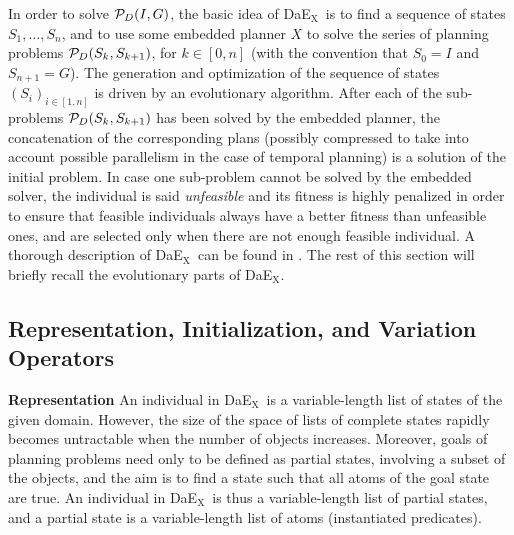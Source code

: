 \documentclass{llncs}
\def\DAEX{{\sc DaE$_{\text{X}}$}}
\renewcommand{\paragraph}[1]{{\bf #1}}
\begin{document}
In order to solve  ${\cal P}_D(I,G)$, the basic idea of \DAEX\ is to find a sequence of states $S_1, \ldots, S_n$, and to use some embedded planner $X$ to solve the series of planning problems ${\cal P}_D(S_{k},S_{k+1})$, for $k \in [0,n]$ (with the convention that $S_0 = I$ and $S_{n+1} = G$).
The generation and optimization of the sequence of states $(S_i)_{i \in [1,n]}$  is driven by an evolutionary algorithm. After each of the sub-problems ${\cal P}_D(S_{k},S_{k+1})$ has been solved by the embedded planner, the concatenation of the corresponding plans (possibly compressed to take into account possible parallelism in the case of temporal planning) is a solution of the initial problem. In case one sub-problem cannot be solved by the embedded solver, the individual is said {\em unfeasible} and its fitness is highly penalized in order to ensure that feasible individuals always have a better fitness than unfeasible ones, and are selected only when there are not enough feasible individual. A thorough description of \DAEX\ can be found in \cite{Bibai2010}. The rest of this section will briefly recall the evolutionary parts of \DAEX.

\subsection{Representation, Initialization, and Variation Operators}

\noindent
\paragraph{Representation}
An individual in \DAEX\ is a  variable-length list of states of the given domain.
However, the size of the space of lists of complete states rapidly becomes untractable when the number of objects increases. Moreover, goals of planning problems need only to be defined as partial states, involving a subset of the objects, and the aim is to find a state such that all atoms of the goal state are true. An individual in \DAEX\ is thus a variable-length list of partial states, and a partial state is a variable-length list of atoms (instantiated predicates).

\noindent
\end{document}
